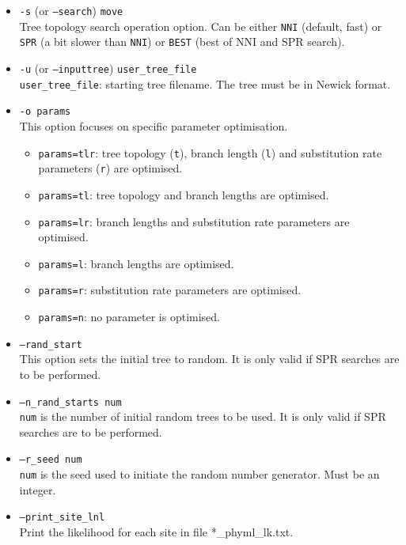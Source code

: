 \documentclass[a4paper,12pt]{article}
\newcommand{\x}[1]{\texttt{#1}}
\begin{document}
\begin{itemize}
\item \x{-s} (or \x{--search}) \x{move} \\
Tree topology search operation option. Can be either \x{NNI} (default, fast) or \x{SPR} (a bit slower than \x{NNI}) or \x{BEST} (best of NNI and SPR search).

\item \x{-u} (or \x{--inputtree}) \x{user\_tree\_file} \\
\x{user\_tree\_file}: starting tree filename. The tree must be in Newick format.

\item \x{-o params} \\
This option focuses on specific parameter optimisation.
\begin{itemize}
\item \x{params=tlr}: tree topology (\x{t}), branch length (\x{l}) and substitution rate parameters (\x{r}) are optimised.
\item \x{params=tl}: tree topology and branch lengths are optimised.
\item \x{params=lr}: branch lengths and substitution rate parameters are optimised.
\item \x{params=l}: branch lengths are optimised.
\item \x{params=r}: substitution rate parameters are optimised.
\item \x{params=n}: no parameter is optimised.
\end{itemize}

\item \x{--rand\_start} \\
This option sets the initial tree to random. It is only valid if SPR searches are to be performed.

\item \x{--n\_rand\_starts num} \\
\x{num} is the number of initial random trees to be used. It is only valid if SPR searches are to be performed.

\item \x{--r\_seed num} \\
\x{num} is the seed used to initiate the random number generator. Must be an integer.

\item \x{--print\_site\_lnl} \\
Print the likelihood for each site in file *\_phyml\_lk.txt.


\end{itemize}
\end{document}
